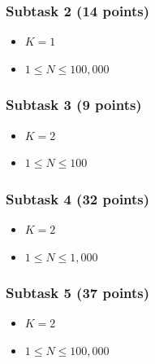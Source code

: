 \documentclass[a4paper]{article}
\begin{document}
\subsubsection*{Subtask 2 (14 points)}
\begin{itemize} \itemsep1pt \parskip0pt
\item $K = 1$
\item $1 \le N \le 100,000$
\end{itemize}

\subsubsection*{Subtask 3 (9 points)}
\begin{itemize} \itemsep1pt \parskip0pt
\item $K = 2$
\item $1 \le N \le 100$
\end{itemize}

\subsubsection*{Subtask 4 (32 points)}
\begin{itemize} \itemsep1pt \parskip0pt
\item $K = 2$
\item $1 \le N \le 1,000$
\end{itemize}

\subsubsection*{Subtask 5 (37 points)}
\begin{itemize} \itemsep1pt \parskip0pt
\item $K = 2$
\item $1 \le N \le 100,000$
\end{itemize}
\end{document}
